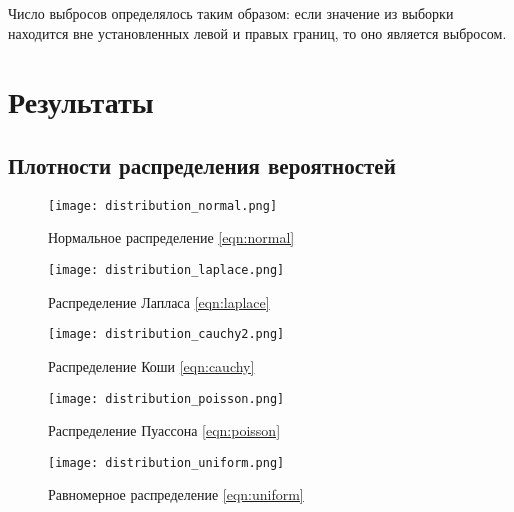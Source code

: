 \documentclass[a4]{article}
\begin{document}
Число выбросов определялось таким образом: если значение из выборки находится вне установленных левой и правых границ, то оно является выбросом.



\newpage
\section{Результаты}


\subsection{Плотности распределения вероятностей}

\begin{figure}[H]
    \centering
    \texttt{[image: distribution\_normal.png]} 
    \caption{Нормальное распределение \eqref{eqn:normal}}
    \label{fig:dis_norm_gis}
\end{figure}

\begin{figure}[H]
    \centering
    \texttt{[image: distribution\_laplace.png]}
    \caption{Распределение Лапласа \eqref{eqn:laplace}}
    \label{fig:dis_lapl_gis}
\end{figure}

\begin{figure}[H]
    \centering
    \texttt{[image: distribution\_cauchy2.png]}
    \caption{Распределение Коши \eqref{eqn:cauchy}}
    \label{fig:dis_cauc_gis}
\end{figure}

\begin{figure}[H]
    \centering
    \texttt{[image: distribution\_poisson.png]}
    \caption{Распределение Пуассона \eqref{eqn:poisson}}
    \label{fig:dis_pois_gis}
\end{figure}

\begin{figure}[H]
    \centering
    \texttt{[image: distribution\_uniform.png]}
    \caption{Равномерное распределение \eqref{eqn:uniform}}
    \label{fig:dis_uni_gis}
\end{figure}
\end{document}
